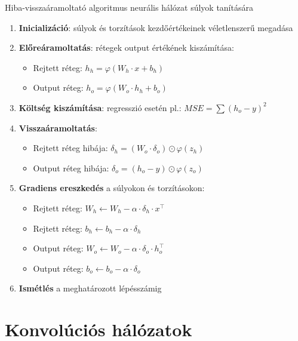 \documentclass[english, aspectratio=169]{beamer}
\makeatletter
\let\origtableofcontents=\tableofcontents
\def\tableofcontents{\@ifnextchar[{\origtableofcontents}{\gobbletableofcontents}}
\def\gobbletableofcontents#1{\origtableofcontents}
\makeatother
\begin{document}
\begin{frame}{Hiba-visszaáramoltató algoritmus neurális hálózat súlyok tanítására}
	\begin{enumerate}
		\item \textbf{Inicializáció}: súlyok és torzítások kezdőértékeinek véletlenszerű megadása
		\item \textbf{Előreáramoltatás}: rétegek output értékének kiszámítása: 
		\begin{itemize}
			\item Rejtett réteg: $h_h = \varphi(W_h \cdot x + b_h)$
			\item Output réteg: $h_o = \varphi(W_o \cdot h_h + b_o)$
		\end{itemize}
		\item \textbf{Költség kiszámítása}: regresszió esetén pl.: $MSE = \sum \left( h_o - y \right)^2$
		\item \textbf{Visszaáramoltatás}: 
		\begin{itemize}
			\item Rejtett réteg hibája: $\delta_h=(W_o \cdot \delta_o) \odot \varphi(z_h)$
			\item Output réteg hibája: $\delta_o=(h_o - y) \odot \varphi(z_o)$
		\end{itemize}
		\item \textbf{Gradiens ereszkedés} a súlyokon és torzításokon:
		\begin{itemize}
			\item Rejtett réteg: $W_h \leftarrow W_h - \alpha \cdot \delta_h \cdot x^\top$
			\item Rejtett réteg: $b_h \leftarrow b_h - \alpha \cdot \delta_h$	
			\item Output réteg: $W_o \leftarrow W_o - \alpha \cdot \delta_o \cdot h_o^\top$
			\item Output réteg: $b_o \leftarrow b_o - \alpha \cdot \delta_o$
			
		\end{itemize}
		\item \textbf{Ismétlés} a meghatározott lépésszámig
	\end{enumerate}
\end{frame}

\section{Konvolúciós hálózatok}

\begin{frame}
	\tableofcontents[currentsection]
\end{frame}
\end{document}
